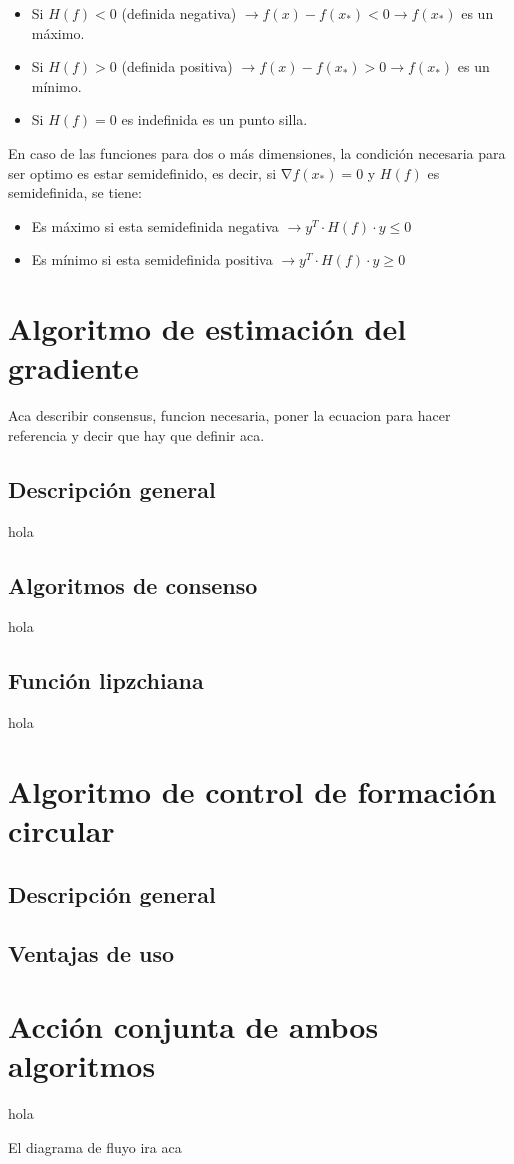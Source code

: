 \begin{itemize}
	\item Si ${H}\left(f\right)<0$ (definida negativa) $\rightarrow{f}\left(x\right)-f\left(x_{*}\right)<0\rightarrow{f}\left(x_{*}\right)$ es un máximo.
	\item Si ${H}\left(f\right)>0$ (definida positiva) $\rightarrow{f}\left(x\right)-f\left(x_{*}\right)>0\rightarrow{f}\left(x_{*}\right)$ es un mínimo.
	\item Si ${H}\left(f\right)=0$ es indefinida es un punto silla.
\end{itemize}

En caso de las funciones para dos o más dimensiones, la condición necesaria para ser optimo es estar semidefinido, es decir, si $\mathrm{\nabla}{f}{\left(x_{*}\right)}=0$ y ${H}\left(f\right)$ es semidefinida, se tiene:

\begin{itemize}
	\item Es máximo si esta semidefinida negativa $\rightarrow{y}^{T}\cdot{H}\left({f}\right)\cdot{y}\leq{0}$
	\item Es mínimo si esta semidefinida positiva $\rightarrow{y}^{T}\cdot{H}\left({f}\right)\cdot{y}\geq{0}$
\end{itemize}

\section{Algoritmo de estimación del gradiente}

Aca describir consensus, funcion necesaria, poner la ecuacion para hacer referencia y decir que hay que definir aca.

\subsection{Descripción general}

hola

\subsection{Algoritmos de consenso}

hola

\subsection{Función lipzchiana}

hola


\section{Algoritmo de control de formación circular}

\subsection{Descripción general}

\subsection{Ventajas de uso}


\section{Acción conjunta de ambos algoritmos}

hola

El diagrama de fluyo ira aca

